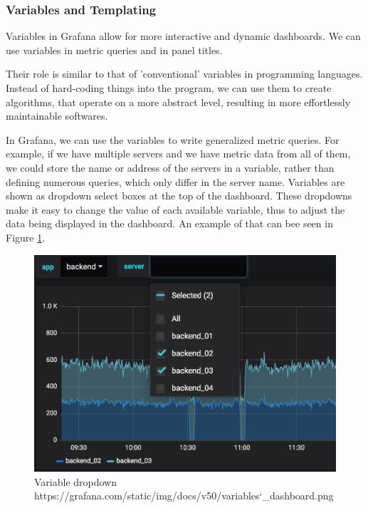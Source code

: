 \subsubsection{Variables and Templating}

Variables in Grafana allow for more interactive and dynamic dashboards. We can use variables in metric queries and in panel titles.

Their role is similar to that of 'conventional' variables in programming languages. Instead of hard-coding things into the program, we can use them to create algorithms, that operate on a more abstract level, resulting in more effortlessly maintainable softwares.

In Grafana, we can use the variables to write generalized metric queries. For example, if we have multiple servers and we have metric data from all of them, we could store the name or address of the servers in a variable, rather than defining numerous queries, which only differ in the server name. Variables are shown as dropdown select boxes at the top of the dashboard. These dropdowns make it easy to change the value of each available variable, thus to adjust the data being displayed in the dashboard. An example of that can bee seen in Figure \ref{fig:variable-dropdown}.

\begin{figure}[H]
	\centering
	\includegraphics[width=130mm, keepaspectratio]{figures/variable-dropdown.png}
	\caption{Variable dropdown https://grafana.com/static/img/docs/v50/variables\char`_dashboard.png}
	\label{fig:variable-dropdown}
\end{figure}

